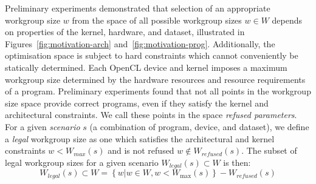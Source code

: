\documentclass[hidelinks]{acaces}
\begin{document}
Preliminary experiments demonstrated that selection of an appropriate
workgroup size $w$ from the space of all possible workgroup sizes
$w \in W$ depends on properties of the kernel, hardware, and dataset,
illustrated in Figures~\ref{fig:motivation-arch}
and~\ref{fig:motivation-prog}. Additionally, the optimisation space is
subject to hard constraints which cannot conveniently be statically
determined. Each OpenCL device and kernel imposes a maximum workgroup
size determined by the hardware resources and resource requirements of
a program. Preliminary experiments found that not all points in the
workgroup size space provide correct programs, even if they satisfy
the kernel and architectural constraints. We call these points in the
space \emph{refused parameters}. For a given \emph{scenario} $s$ (a
combination of program, device, and dataset), we define a
\textit{legal} workgroup size as one which satisfies the architectural
and kernel constraints $w < W_{max}(s)$ and is not refused
$w \notin W_{refused}(s)$. The subset of legal workgroup sizes for a
given scenario $W_{legal}(s) \subset W$ is then:
%
\begin{equation}
  W_{legal}(s) \subset W = \left\{w | w \in W, w < W_{\max}(s) \right\} - W_{refused}(s)
\end{equation}
\end{document}
